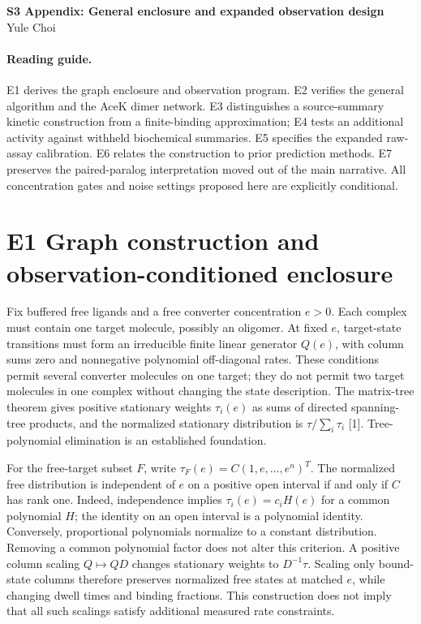 \documentclass[11pt]{article}
\begin{document}
\begin{center}{\Large\bfseries S3 Appendix: General enclosure and expanded observation design}\\[.5em]Yule Choi\end{center}
\onehalfspacing
\paragraph{Reading guide.} E1 derives the graph enclosure and observation program. E2 verifies the general algorithm and the AceK dimer network. E3 distinguishes a source-summary kinetic construction from a finite-binding approximation; E4 tests an additional activity against withheld biochemical summaries. E5 specifies the expanded raw-assay calibration. E6 relates the construction to prior prediction methods. E7 preserves the paired-paralog interpretation moved out of the main narrative. All concentration gates and noise settings proposed here are explicitly conditional.

\section*{E1 Graph construction and observation-conditioned enclosure}
Fix buffered free ligands and a free converter concentration $e>0$. Each complex must contain one target molecule, possibly an oligomer. At fixed $e$, target-state transitions must form an irreducible finite linear generator $Q(e)$, with column sums zero and nonnegative polynomial off-diagonal rates. These conditions permit several converter molecules on one target; they do not permit two target molecules in one complex without changing the state description. The matrix-tree theorem gives positive stationary weights $\tau_i(e)$ as sums of directed spanning-tree products, and the normalized stationary distribution is $\tau/\sum_i\tau_i$ [1]. Tree-polynomial elimination is an established foundation.

For the free-target subset $F$, write $\tau_F(e)=C(1,e,\ldots,e^n)^T$. The normalized free distribution is independent of $e$ on a positive open interval if and only if $C$ has rank one. Indeed, independence implies $\tau_i(e)=c_i H(e)$ for a common polynomial $H$; the identity on an open interval is a polynomial identity. Conversely, proportional polynomials normalize to a constant distribution. Removing a common polynomial factor does not alter this criterion. A positive column scaling $Q\mapsto QD$ changes stationary weights to $D^{-1}\tau$. Scaling only bound-state columns therefore preserves normalized free states at matched $e$, while changing dwell times and binding fractions. This construction does not imply that all such scalings satisfy additional measured rate constraints.
\end{document}
